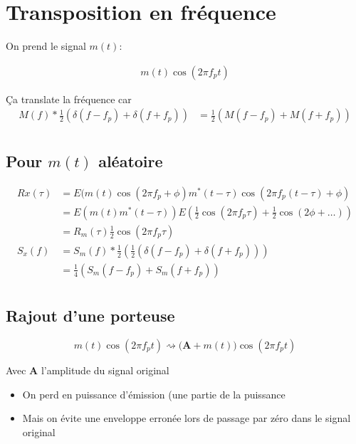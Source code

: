 \documentclass{article}
\begin{document}
\section{Transposition en fréquence}

On prend le signal $m(t)$:

 \begin{align*}
    m(t) \cos(2 \pi f_p t)
\end{align*}

Ça translate la fréquence car 
\begin{align*}
    M(f) \ast \frac{1}{2} \left( \delta(f-f_p) + \delta(f+f_p) \right)  &= \frac{1}{2} \left( M(f-f_p) + M(f+f_p) \right)  \\
\end{align*}

\subsection{Pour $m(t)$ aléatoire}

\begin{align*}
    Rx(\tau) &= E(m(t) \cos(2 \pi f_p + \phi) m^\ast(t-\tau) \cos(2 \pi f_p(t-\tau) + \phi) \\
    &= E(m(t) m^\ast(t-\tau)) E(\frac{1}{2} \cos(2 \pi f_p \tau) + \frac{1}{2} \cos(2 \phi + \ldots)) \\
    &= R_m(\tau) \frac{1}{2} \cos(2 \pi f_p \tau) \\
    S_x(f) &= S_m(f)  \ast \frac{1}{2} \left( \frac{1}{2} \left( \delta(f-f_p) + \delta(f+f_p) \right)  \right)  \\
    &= \frac{1}{4} \left( S_m(f-f_p) + S_m(f+f_p)  \right)  \\
\end{align*}

\subsection{Rajout d'une porteuse}

 \[
     m(t) \cos(2 \pi f_p t) \rightsquigarrow \mathbf{( A + }m(t)\mathbf{)} \cos(2 \pi f_p t)
\] 

Avec $\mathbf{A}$ l'amplitude du signal original

\begin{itemize}
    \item On perd en puissance d'émission  (une partie de la puissance 
    \item Mais on évite une enveloppe erronée lors de passage par zéro dans le signal original
\end{itemize}
\end{document}

